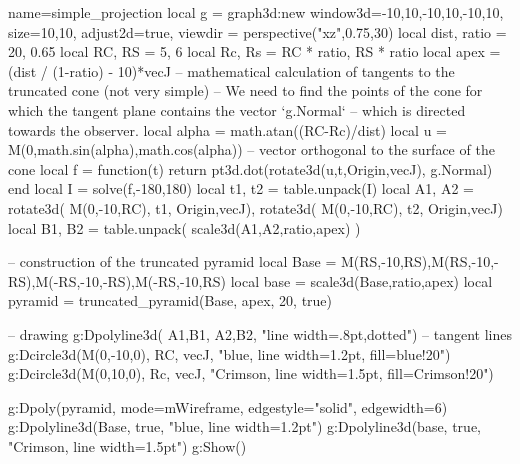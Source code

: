 \documentclass{standalone}
\begin{document}
\begin{luadraw}{name=simple_projection}
    local g = graph3d:new{
        window3d={-10,10,-10,10,-10,10}, 
        size={10,10}, adjust2d=true,
        viewdir = perspective("xz",0.75,30)
    }
    local dist, ratio = 20, 0.65
    local RC, RS = 5, 6
    local Rc, Rs = RC * ratio, RS * ratio
    local apex = (dist / (1-ratio) - 10)*vecJ
    -- mathematical calculation of tangents to the truncated cone (not very simple)
    -- We need to find the points of the cone for which the tangent plane contains the vector `g.Normal`
    -- which is directed towards the observer.
    local alpha = math.atan((RC-Rc)/dist)
    local u = M(0,math.sin(alpha),math.cos(alpha)) -- vector orthogonal to the surface of the cone
    local f = function(t) return pt3d.dot(rotate3d(u,t,{Origin,vecJ}), g.Normal) end
    local I = solve(f,-180,180)
    local t1, t2 = table.unpack(I)
    local A1, A2 = rotate3d( M(0,-10,RC), t1, {Origin,vecJ}), rotate3d( M(0,-10,RC), t2, {Origin,vecJ})
    local B1, B2 = table.unpack( scale3d({A1,A2},ratio,apex) )
    
    -- construction of the truncated pyramid
    local Base = {M(RS,-10,RS),M(RS,-10,-RS),M(-RS,-10,-RS),M(-RS,-10,RS)}
    local base = scale3d(Base,ratio,apex)
    local pyramid = truncated_pyramid(Base, apex, 20, true)
    
    -- drawing
    g:Dpolyline3d( {{A1,B1}, {A2,B2}}, "line width=.8pt,dotted") -- tangent lines
    g:Dcircle3d(M(0,-10,0), RC, vecJ, "blue, line width=1.2pt, fill=blue!20")
    g:Dcircle3d(M(0,10,0), Rc, vecJ, "Crimson, line width=1.5pt, fill=Crimson!20")
    
    g:Dpoly(pyramid, {mode=mWireframe, edgestyle="solid", edgewidth=6})
    g:Dpolyline3d(Base, true, "blue, line width=1.2pt")
    g:Dpolyline3d(base, true, "Crimson, line width=1.5pt")
    g:Show()
\end{luadraw}
\end{document}
